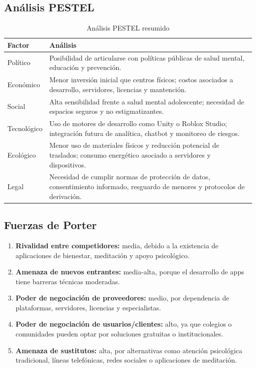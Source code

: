 \documentclass[12pt,letterpaper]{article}
\begin{document}
\subsection{Análisis PESTEL}
\begin{table}[H]
\centering
\caption{Análisis PESTEL resumido}
\begin{tabularx}{\textwidth}{p{3cm} X}
\toprule
\textbf{Factor} & \textbf{Análisis} \\
\midrule
Político & Posibilidad de articularse con políticas públicas de salud mental, educación y prevención. \\
Económico & Menor inversión inicial que centros físicos; costos asociados a desarrollo, servidores, licencias y mantención. \\
Social & Alta sensibilidad frente a salud mental adolescente; necesidad de espacios seguros y no estigmatizantes. \\
Tecnológico & Uso de motores de desarrollo como Unity o Roblox Studio; integración futura de analítica, chatbot y monitoreo de riesgos. \\
Ecológico & Menor uso de materiales físicos y reducción potencial de traslados; consumo energético asociado a servidores y dispositivos. \\
Legal & Necesidad de cumplir normas de protección de datos, consentimiento informado, resguardo de menores y protocolos de derivación. \\
\bottomrule
\end{tabularx}
\end{table}

\subsection{Fuerzas de Porter}
\begin{enumerate}[leftmargin=*]
    \item \textbf{Rivalidad entre competidores:} media, debido a la existencia de aplicaciones de bienestar, meditación y apoyo psicológico.
    \item \textbf{Amenaza de nuevos entrantes:} media-alta, porque el desarrollo de apps tiene barreras técnicas moderadas.
    \item \textbf{Poder de negociación de proveedores:} medio, por dependencia de plataformas, servidores, licencias y especialistas.
    \item \textbf{Poder de negociación de usuarios/clientes:} alto, ya que colegios o comunidades pueden optar por soluciones gratuitas o institucionales.
    \item \textbf{Amenaza de sustitutos:} alta, por alternativas como atención psicológica tradicional, líneas telefónicas, redes sociales o aplicaciones de meditación.
\end{enumerate}
\end{document}
